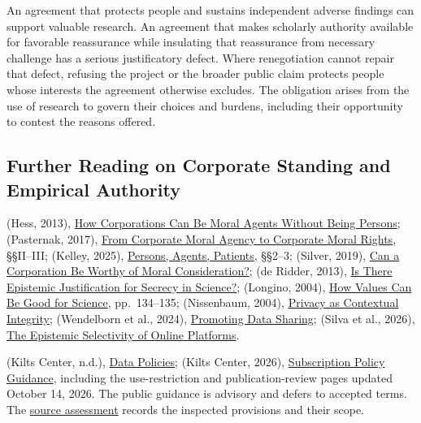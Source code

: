 An agreement that protects people and sustains independent adverse
findings can support valuable research. An agreement that makes
scholarly authority available for favorable reassurance while insulating
that reassurance from necessary challenge has a serious justificatory
defect. Where renegotiation cannot repair that defect, refusing the
project or the broader public claim protects people whose interests the
agreement otherwise excludes. The obligation arises from the use of
research to govern their choices and burdens, including their
opportunity to contest the reasons offered.

\hypertarget{M09-further-reading-on-corporate-standing-and-empirical-authority}{%
\subsection*{Further Reading on Corporate Standing and Empirical
Authority}\label{M09-further-reading-on-corporate-standing-and-empirical-authority}}

\noindent (Hess, 2013), \href{https://doi.org/10.1007/s10790-013-9391-z}{How
Corporations Can Be Moral Agents Without Being Persons}; (Pasternak,
2017), \href{https://doi.org/10.1515/lehr-2017-0003}{From Corporate
Moral Agency to Corporate Moral Rights}, §§II--III; (Kelley, 2025),
\href{https://doi.org/10.1007/s11245-025-10182-8}{Persons, Agents,
Patients}, §§2--3; (Silver, 2019),
\href{https://doi.org/10.1007/s10551-018-3787-4}{Can a Corporation Be
Worthy of Moral Consideration?}; (de Ridder, 2013),
\href{https://doi.org/10.1017/epi.2013.18}{Is There Epistemic
Justification for Secrecy in Science?}; (Longino, 2004),
\href{https://www.ugr.es/~zink/mono/Longino2004.pdf}{How Values Can Be
Good for Science}, pp.~134--135; (Nissenbaum, 2004),
\href{https://digitalcommons.law.uw.edu/wlr/vol79/iss1/10/}{Privacy as
Contextual Integrity}; (Wendelborn et al., 2024),
\href{https://doi.org/10.1007/s11948-024-00491-3}{Promoting Data
Sharing}; (Silva et al., 2026),
\href{https://doi.org/10.1177/29768624261425376}{The Epistemic
Selectivity of Online Platforms}.

(Kilts Center, n.d.),
\href{https://www.chicagobooth.edu/research/kilts/research-data/nielseniq/policies}{Data
Policies}; (Kilts Center, 2026),
\href{https://kiltsdata.chicagobooth.edu/docs/datasets/subscriptions/data-policies/}{Subscription
Policy Guidance}, including the use-restriction and publication-review
pages updated October 14, 2026. The public guidance is advisory and
defers to accepted terms. The
\href{../01_Resources/45_Data_Truth_and_Norms/06_Corporate_Standing/KILTS_CASE.md}{source
assessment} records the inspected provisions and their scope.


